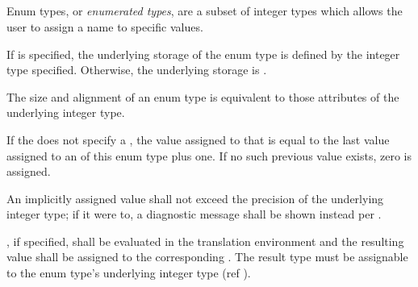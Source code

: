 
\begin{grammar}
 \\
	 \terminal{\{}  \terminal{\}} \\
	  \terminal{\{}  \terminal{\}} \\

 \\
	 \optional{\terminal{,}} \\
	 \terminal{,}  \\

 \\
	 \\
	 \terminal{=}  \\
\end{grammar}

\specsubsubitem
Enum types, or \textit{enumerated types}, are a subset of integer types which
allows the user to assign a name to specific values.

\specsubsubitem
If  is specified, the underlying storage of the enum
type is defined by the integer type specified. Otherwise, the underlying storage
is .

\specsubsubitem
The size and alignment of an enum type is equivalent to those attributes of the
underlying integer type.

\specsubsubitem
If the  does not specify a
, the value assigned to that 
is equal to the last value assigned to an  of this enum
type plus one. If no such previous value exists, zero is assigned.

\specsubsubitem
An implicitly assigned value shall not exceed the precision of the underlying
integer type; if it were to, a diagnostic message shall be shown instead per
.

\specsubsubitem
{}, if specified, shall be evaluated in the
translation environment and the resulting value shall be assigned to the
corresponding . The result type must be assignable to
the enum type's underlying integer type (ref ).

